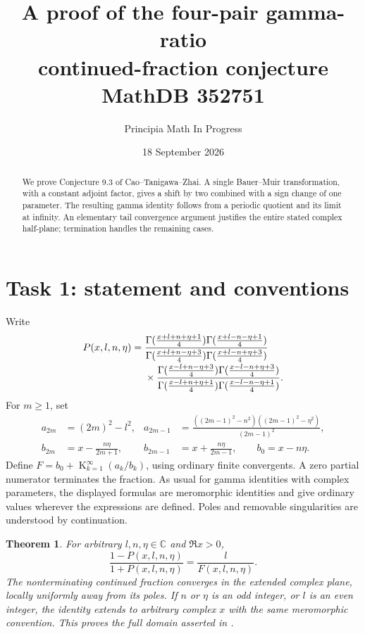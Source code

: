 \documentclass[11pt]{article}
\title{A proof of the four-pair gamma-ratio\\continued-fraction conjecture\\MathDB 352751}
\author{Principia Math In Progress}
\date{18 September 2026}
\newtheorem{theorem}{Theorem}
\newcommand{\CF}{\mathop{\mathrm K}}
\begin{document}
\maketitle
\begin{abstract}
We prove Conjecture 9.3 of Cao--Tanigawa--Zhai. A single
Bauer--Muir transformation, with a constant adjoint factor, gives
a shift by two combined with a sign change of one parameter.
The resulting gamma identity follows from a periodic quotient
and its limit at infinity. An elementary tail convergence argument
justifies the entire stated complex half-plane; termination handles
the remaining cases.
\end{abstract}

\section*{Task 1: statement and conventions}
Write
\begin{align}
P(x,l,n,\eta)
={}&
\frac{\Gamma(\frac{x+l+n+\eta+1}{4})
      \Gamma(\frac{x+l-n-\eta+1}{4})}
     {\Gamma(\frac{x+l+n-\eta+3}{4})
      \Gamma(\frac{x+l-n+\eta+3}{4})}
\notag\\[-2pt]
&{}\times
\frac{\Gamma(\frac{x-l+n-\eta+3}{4})
      \Gamma(\frac{x-l-n+\eta+3}{4})}
     {\Gamma(\frac{x-l+n+\eta+1}{4})
      \Gamma(\frac{x-l-n-\eta+1}{4})}.
\label{P}
\end{align}
For \(m\ge1\), set
\begin{align}
a_{2m}&=(2m)^2-l^2,&
a_{2m-1}&=\frac{((2m-1)^2-n^2)((2m-1)^2-\eta^2)}
                    {(2m-1)^2},\label{a}\\
b_{2m}&=x-\frac{n\eta}{2m+1},&
b_{2m-1}&=x+\frac{n\eta}{2m-1},\qquad b_0=x-n\eta.
\label{b}
\end{align}
Define \(F=b_0+\CF_{k=1}^{\infty}(a_k/b_k)\), using ordinary
finite convergents. A zero partial numerator terminates the fraction.
As usual for gamma identities with complex parameters, the displayed
formulas are meromorphic identities and give ordinary values wherever
the expressions are defined. Poles and removable singularities are
understood by continuation.

\begin{theorem}\label{main}
For arbitrary \(l,n,\eta\in\mathbb C\) and \(\Re x>0\),
\begin{equation}
 \frac{1-P(x,l,n,\eta)}{1+P(x,l,n,\eta)}
     =\frac{l}{F(x,l,n,\eta)}.
\label{answer}
\end{equation}
The nonterminating continued fraction converges in the extended
complex plane, locally uniformly away from its poles.
If \(n\) or \(\eta\) is an odd integer, or \(l\) is an even integer,
the identity extends to arbitrary complex \(x\) with the same
meromorphic convention. This proves the full domain asserted in
\cite[Conjecture 9.3, p.~30]{CTZ}.
\end{theorem}
\end{document}

